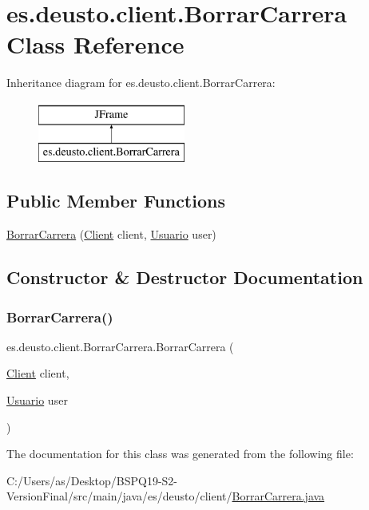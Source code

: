 \hypertarget{classes_1_1deusto_1_1client_1_1_borrar_carrera}{}\section{es.\+deusto.\+client.\+Borrar\+Carrera Class Reference}
\label{classes_1_1deusto_1_1client_1_1_borrar_carrera}
Inheritance diagram for es.\+deusto.\+client.\+Borrar\+Carrera\+:\begin{figure}[H]
\begin{center}
\leavevmode
\includegraphics[height=2.000000cm]{classes_1_1deusto_1_1client_1_1_borrar_carrera}
\end{center}
\end{figure}
\subsection*{Public Member Functions}
\begin{DoxyCompactItemize}
\item 
\mbox{\hyperlink{classes_1_1deusto_1_1client_1_1_borrar_carrera_a9fecff6662045446f0475bc998ba19b5}{Borrar\+Carrera}} (\mbox{\hyperlink{classes_1_1deusto_1_1client_1_1_client}{Client}} client, \mbox{\hyperlink{classes_1_1deusto_1_1server_1_1jdo_1_1_usuario}{Usuario}} user)
\end{DoxyCompactItemize}


\subsection{Constructor \& Destructor Documentation}
\mbox{\label{classes_1_1deusto_1_1client_1_1_borrar_carrera_a9fecff6662045446f0475bc998ba19b5}} 
\subsubsection{\texorpdfstring{BorrarCarrera()}{BorrarCarrera()}}
{\footnotesize\ttfamily es.\+deusto.\+client.\+Borrar\+Carrera.\+Borrar\+Carrera (\begin{DoxyParamCaption}\item[{\mbox{\hyperlink{classes_1_1deusto_1_1client_1_1_client}{Client}}}]{client,  }\item[{\mbox{\hyperlink{classes_1_1deusto_1_1server_1_1jdo_1_1_usuario}{Usuario}}}]{user }\end{DoxyParamCaption})}



The documentation for this class was generated from the following file\+:\begin{DoxyCompactItemize}
\item 
C\+:/\+Users/as/\+Desktop/\+B\+S\+P\+Q19-\/\+S2-\/\+Version\+Final/src/main/java/es/deusto/client/\mbox{\hyperlink{_borrar_carrera_8java}{Borrar\+Carrera.\+java}}\end{DoxyCompactItemize}
